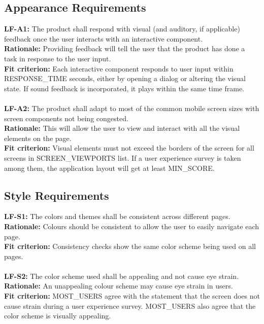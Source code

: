 \documentclass[12pt]{article}
\begin{document}
\subsection{Appearance Requirements}
  \textbf{LF-A1:} The product shall respond with visual (and auditory, if applicable) feedback once the user interacts with an interactive component.\\
  \textbf{Rationale:} Providing feedback will tell the user that the product has done a task in response to the user input.\\
  \textbf{Fit criterion:} Each interactive component responds to user input within RESPONSE\_TIME seconds, either by opening a dialog or altering the visual state. If sound feedback is incorporated, it plays within the same time frame.\\\\
  \textbf{LF-A2:} The product shall adapt to most of the common mobile screen sizes with screen components not being congested.\\
  \textbf{Rationale:} This will allow the user to view and interact with all the visual elements on the page.\\
  \textbf{Fit criterion:} Visual elements must not exceed the borders of the screen for all screens in SCREEN\_VIEWPORTS list. If a user experience survey is taken among them, the application layout will get at least MIN\_SCORE.\\

\subsection{Style Requirements}
  \textbf{LF-S1:} The colors and themes shall be consistent across different pages.\\
  \textbf{Rationale:} Colours should be consistent to allow the user to easily navigate each page.\\
  \textbf{Fit criterion:} Consistency checks show the same color scheme being used on all pages.\\\\
  \textbf{LF-S2:} The color scheme used shall be appealing and not cause eye strain.\\
  \textbf{Rationale:} An unappealing colour scheme may cause eye strain in users.\\
  \textbf{Fit criterion:} MOST\_USERS agree with the statement that the screen does not cause strain during a user experience survey. MOST\_USERS also agree that the color scheme is visually appealing.\\
\end{document}
